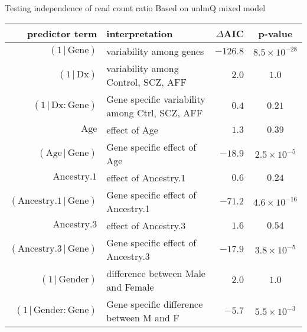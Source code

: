 \documentclass{beamer}
\begin{document}
\begin{frame}{Testing independence of read count ratio}
{Based on unlmQ mixed model}
\tiny
\begin{table}[H]
\begin{center}
\begin{tabular}{rlrc}
predictor term                              & interpretation&   \(\Delta\)AIC &        p-value \\
\hline
\((1\,|\,\mathrm{Gene})\)                   & variability among genes & \(-126.8\)  & \(8.5\times 10^{-28}\) \\
\((1\,|\,\mathrm{Dx})\)                     & variability among Control, SCZ, AFF & \(2.0\)  & \(1.0\)  \\
\((1\,|\,\mathrm{Dx}:\mathrm{Gene})\)       & Gene specific variability among Ctrl, SCZ, AFF & \(0.4\) &  \(0.21\) \\
\(\mathrm{Age}\)                            & effect of Age & \(1.3\)   & \(0.39\) \\
\((\mathrm{Age}\,|\,\mathrm{Gene})\)        & Gene specific effect of Age & \(-18.9\)  & \(2.5\times 10^{-5}\)  \\
\(\mathrm{Ancestry.1}\)                     & effect of Ancestry.1 & \(0.6\)  & \(0.24\) \\
\((\mathrm{Ancestry.1}\,|\,\mathrm{Gene})\) & Gene specific effect of Ancestry.1 & \(-71.2\)   & \(4.6\times 10^{-16}\) \\
\(\mathrm{Ancestry.3}\)                     & effect of Ancestry.3 & \(1.6\)  & \(0.54\) \\
\((\mathrm{Ancestry.3}\,|\,\mathrm{Gene})\) & Gene specific effect of Ancestry.3 & \(-17.9\)   & \(3.8\times 10^{-5}\) \\
\((1\,|\,\mathrm{Gender})\)                 & difference between Male and Female & \(2.0\)  & \(1.0\)  \\
\((1\,|\,\mathrm{Gender}:\mathrm{Gene})\)   & Gene specific difference between M and F & \(-5.7\) &  \(5.5\times 10^{-3}\) \\
\end{tabular}
\end{center}
\end{table}
\end{frame}

\end{document}
